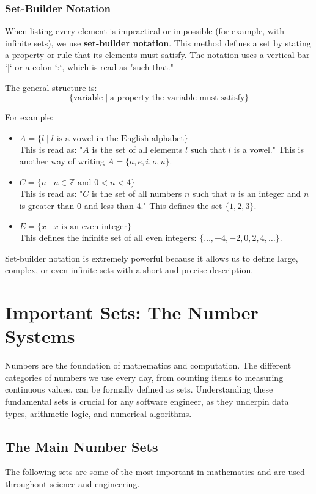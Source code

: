 \subsubsection*{Set-Builder Notation}
When listing every element is impractical or impossible (for example, with infinite sets), we use \textbf{set-builder notation}. This method defines a set by stating a property or rule that its elements must satisfy. The notation uses a vertical bar `|` or a colon `:`, which is read as "such that."

The general structure is:
\[ \{ \text{variable} \mid \text{a property the variable must satisfy} \} \]

For example:
\begin{itemize}
    \item $A = \{ l \mid l \text{ is a vowel in the English alphabet} \}$ \\
    This is read as: "$A$ is the set of all elements $l$ such that $l$ is a vowel." This is another way of writing $A = \{a, e, i, o, u\}$.
    
    \item $C = \{ n \mid n \in \mathbb{Z} \text{ and } 0 < n < 4 \}$ \\
    This is read as: "$C$ is the set of all numbers $n$ such that $n$ is an integer and $n$ is greater than 0 and less than 4." This defines the set $\{1, 2, 3\}$.
    
    \item $E = \{ x \mid x \text{ is an even integer} \}$ \\
    This defines the infinite set of all even integers: $\{\dots, -4, -2, 0, 2, 4, \dots\}$.
\end{itemize}

Set-builder notation is extremely powerful because it allows us to define large, complex, or even infinite sets with a short and precise description.

\section{Important Sets: The Number Systems}
Numbers are the foundation of mathematics and computation. The different categories of numbers we use every day, from counting items to measuring continuous values, can be formally defined as sets. Understanding these fundamental sets is crucial for any software engineer, as they underpin data types, arithmetic logic, and numerical algorithms.

\subsection*{The Main Number Sets}
The following sets are some of the most important in mathematics and are used throughout science and engineering.

